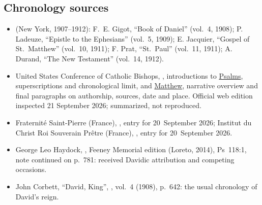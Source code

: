 {\subsection*{Chronology sources}
\begin{itemize}
\item {} (New York, 1907--1912): F.~E. Gigot, ``Book of Daniel'' (vol.~4, 1908); P. Ladeuze, ``Epistle to the Ephesians'' (vol.~5, 1909); E. Jacquier, ``Gospel of St.~Matthew'' (vol.~10, 1911); F. Prat, ``St.~Paul'' (vol.~11, 1911); A. Durand, ``The New Testament'' (vol.~14, 1912).
\item United States Conference of Catholic Bishops, , introductions to \href{https://bible.usccb.org/bible/psalms/0}{Psalms}, superscriptions and chronological limit, and \href{https://bible.usccb.org/bible/matthew/0}{Matthew}, narrative overview and final paragraphs on authorship, sources, date and place. Official web edition inspected 21 September 2026; summarized, not reproduced.
\item Fraternité Saint-Pierre (France), , entry for 20~September 2026; Institut du Christ Roi Souverain Prêtre (France), , entry for 20~September 2026.
\item George Leo Haydock, , Feeney Memorial edition (Loreto, 2014), Ps~118:1, note continued on p.~781: received Davidic attribution and competing occasions.
\item John Corbett, ``David, King'', , vol.~4 (1908), p.~642: the usual chronology of David's reign.
\end{itemize}
\par}
